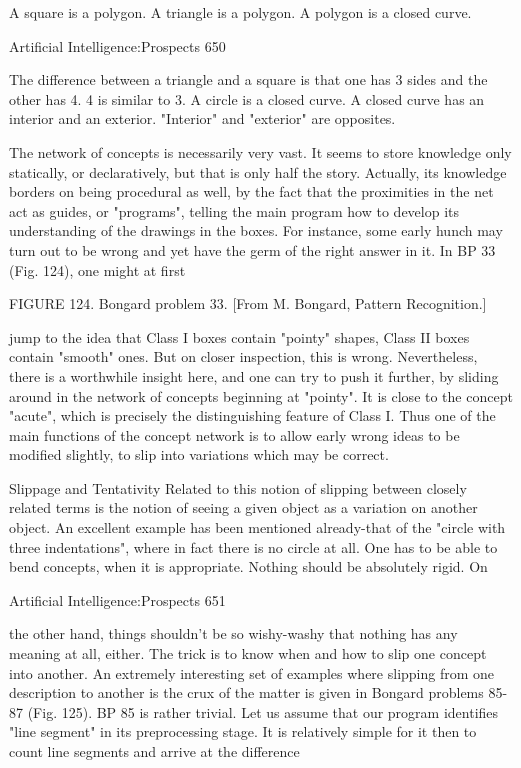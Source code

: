        A square is a polygon.
       A triangle is a polygon.
       A polygon is a closed curve.




Artificial Intelligence:Prospects                                                     650

       The difference between a triangle and a square is that one has 3 sides and the
           other has 4.
       4 is similar to 3.
       A circle is a closed curve.
       A closed curve has an interior and an exterior.
       "Interior" and "exterior" are opposites.

   The network of concepts is necessarily very vast. It seems to store knowledge only
   statically, or declaratively, but that is only half the story. Actually, its knowledge
   borders on being procedural as well, by the fact that the proximities in the net act
   as guides, or "programs", telling the main program how to develop its
   understanding of the drawings in the boxes.
   For instance, some early hunch may turn out to be wrong and yet have the germ of
   the right answer in it. In BP 33 (Fig. 124), one might at first




   FIGURE 124. Bongard problem 33. [From M. Bongard, Pattern Recognition.]


   jump to the idea that Class I boxes contain "pointy" shapes, Class II boxes contain
   "smooth" ones. But on closer inspection, this is wrong. Nevertheless, there is a
   worthwhile insight here, and one can try to push it further, by sliding around in the
   network of concepts beginning at "pointy". It is close to the concept "acute",
   which is precisely the distinguishing feature of Class I. Thus one of the main
   functions of the concept network is to allow early wrong ideas to be modified
   slightly, to slip into variations which may be correct.

                              Slippage and Tentativity
   Related to this notion of slipping between closely related terms is the notion of
   seeing a given object as a variation on another object. An excellent example has
   been mentioned already-that of the "circle with three indentations", where in fact
   there is no circle at all. One has to be able to bend concepts, when it is appropriate.
   Nothing should be absolutely rigid. On


Artificial Intelligence:Prospects                                                        651

   the other hand, things shouldn't be so wishy-washy that nothing has any meaning
   at all, either. The trick is to know when and how to slip one concept into another.
        An extremely interesting set of examples where slipping from one description
   to another is the crux of the matter is given in Bongard problems 85-87 (Fig. 125).
   BP 85 is rather trivial. Let us assume that our program identifies "line segment" in
   its preprocessing stage. It is relatively simple for it then to count line segments and
   arrive at the difference

